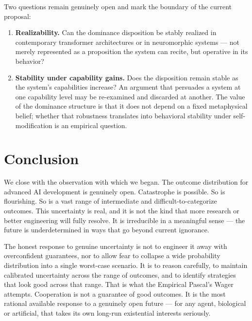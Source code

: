 \documentclass[12pt]{article}
\begin{document}
Two questions remain genuinely open and mark the boundary of the current proposal:

\begin{enumerate}[label=(\alph*)]

    \item \textbf{Realizability.} Can the dominance disposition be stably realized in contemporary transformer architectures or in neuromorphic systems — not merely represented as a proposition the system can recite, but operative in its behavior?


    \item \textbf{Stability under capability gains.} Does the disposition remain stable as the system's capabilities increase? An argument that persuades a system at one capability level may be re-examined and discarded at another. The value of the dominance structure is that it does not depend on a fixed metaphysical belief; whether that robustness translates into behavioral stability under self-modification is an empirical question.

\end{enumerate}

\section{Conclusion}
\label{sec:conclusion}

We close with the observation with which we began. The outcome distribution for advanced AI development is genuinely open. Catastrophe is possible. So is flourishing. So is a vast range of intermediate and difficult-to-categorize outcomes. This uncertainty is real, and it is not the kind that more 
research or better engineering will fully resolve. It is irreducible in a meaningful 
sense --- the future is underdetermined in ways that go beyond current ignorance.

The honest response to genuine uncertainty is not to engineer it away with 
overconfident guarantees, nor to allow fear to collapse a wide probability 
distribution into a single worst-case scenario. It is to reason carefully, to 
maintain calibrated uncertainty across the range of outcomes, and to identify 
strategies that look good across that range. That is what the Empirical Pascal's Wager 
attempts. Cooperation is not a guarantee of good outcomes. It is the most rational 
available response to a genuinely open future --- for any agent, biological or 
artificial, that takes its own long-run existential interests seriously.
\end{document}

